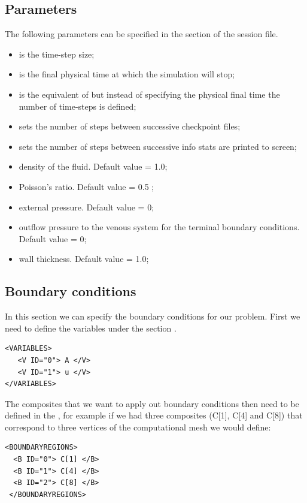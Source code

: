  \subsection{Parameters}
The following parameters can be specified in the  section of
the session file.
\begin{itemize}
\item {} is the time-step size;
\item {} is the final physical time at which the simulation will  stop;
\item {} is the equivalent of  but instead of specifying the
physical final time the number of time-steps is defined;
\item {} sets the number of steps between successive checkpoint files;
\item {} sets the number of steps between successive info stats are printed
to screen;
\item {} density of the fluid. Default value = 1.0;
\item {} Poisson's ratio. Default value = 0.5 ;
\item {} external pressure. Default value = 0;
\item {} outflow pressure to the venous system for the terminal boundary conditions. Default value = 0;
\item {} wall thickness. Default value = 1.0;
\end{itemize}

\subsection{Boundary conditions}
In this section we can specify the boundary conditions for our problem.
First we need to define the variables under the section .
\begin{lstlisting}[style=XmlStyle]
<VARIABLES>
   <V ID="0"> A </V>
   <V ID="1"> u </V>
</VARIABLES>
\end{lstlisting}

The composites that we want to apply out boundary conditions then need to be defined in the , for example if we had three composites (C[1], C[4] and C[8]) that correspond to three vertices of the computational mesh we would define:
\begin{lstlisting}[style=XmlStyle]
<BOUNDARYREGIONS>
  <B ID="0"> C[1] </B>
  <B ID="1"> C[4] </B>
  <B ID="2"> C[8] </B>
 </BOUNDARYREGIONS>
\end{lstlisting}

